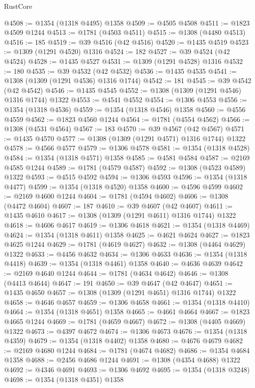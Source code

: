 \begin{lexlean}{RustCore}
\begin{coremodule}
@4508 := @1354 (@1318 @4495) @1358
@4509 := @4505 @4508
@4511 := @1823 @4509 @1244
@4513 := @1781 (@4503 @4511)
@4515 := @1308 (@4480 @4513)
@4516 := 185
@4519 := @39 @4516 (@42 @4516)
@4520 := @1435 @4519
@4523 := @1309 (@1291 @4520) @1316
@4524 := 182
@4527 := @39 @4524 (@42 @4524)
@4528 := @1435 @4527
@4531 := @1309 (@1291 @4528) @1316
@4532 := 180
@4535 := @39 @4532 (@42 @4532)
@4536 := @1435 @4535
@4541 := @1308 (@1309 (@1291 @4536) @1316 @1744)
@4542 := 181
@4545 := @39 @4542 (@42 @4542)
@4546 := @1435 @4545
@4552 := @1308 (@1309 (@1291 @4546) @1316 @1744) @1322
@4553 := @4541 @4552
@4554 := @1306 @4553
@4556 := @1354 (@1318 @4536)
@4559 := @1354 (@1318 @4546) @1358
@4560 := @4556 @4559
@4562 := @1823 @4560 @1244
@4564 := @1781 (@4554 @4562)
@4566 := @1308 (@4531 @4564)
@4567 := 183
@4570 := @39 @4567 (@42 @4567)
@4571 := @1435 @4570
@4577 := @1308 (@1309 (@1291 @4571) @1316 @1744) @1322
@4578 := @4566 @4577
@4579 := @1306 @4578
@4581 := @1354 (@1318 @4528)
@4584 := @1354 (@1318 @4571) @1358
@4585 := @4581 @4584
@4587 := @2169 @4585 @1244
@4589 := @1781 (@4579 @4587)
@4592 := @1308 (@4523 @4589) @1322
@4593 := @4515 @4592
@4594 := @1306 @4593
@4596 := @1354 (@1318 @4477)
@4599 := @1354 (@1318 @4520) @1358
@4600 := @4596 @4599
@4602 := @2169 @4600 @1244
@4604 := @1781 (@4594 @4602)
@4606 := @1308 (@4472 @4604)
@4607 := 187
@4610 := @39 @4607 (@42 @4607)
@4611 := @1435 @4610
@4617 := @1308 (@1309 (@1291 @4611) @1316 @1744) @1322
@4618 := @4606 @4617
@4619 := @1306 @4618
@4621 := @1354 (@1318 @4469)
@4624 := @1354 (@1318 @4611) @1358
@4625 := @4621 @4624
@4627 := @1823 @4625 @1244
@4629 := @1781 (@4619 @4627)
@4632 := @1308 (@4464 @4629) @1322
@4633 := @4456 @4632
@4634 := @1306 @4633
@4636 := @1354 (@1318 @4418)
@4639 := @1354 (@1318 @4461) @1358
@4640 := @4636 @4639
@4642 := @2169 @4640 @1244
@4644 := @1781 (@4634 @4642)
@4646 := @1308 (@4413 @4644)
@4647 := 191
@4650 := @39 @4647 (@42 @4647)
@4651 := @1435 @4650
@4657 := @1308 (@1309 (@1291 @4651) @1316 @1744) @1322
@4658 := @4646 @4657
@4659 := @1306 @4658
@4661 := @1354 (@1318 @4410)
@4664 := @1354 (@1318 @4651) @1358
@4665 := @4661 @4664
@4667 := @1823 @4665 @1244
@4669 := @1781 (@4659 @4667)
@4672 := @1308 (@4405 @4669) @1322
@4673 := @4397 @4672
@4674 := @1306 @4673
@4676 := @1354 (@1318 @4359)
@4679 := @1354 (@1318 @4402) @1358
@4680 := @4676 @4679
@4682 := @2169 @4680 @1244
@4684 := @1781 (@4674 @4682)
@4686 := @1354 @4684 @1358
@4688 := @2456 @4686 @1244
@4691 := @1308 (@4354 @4688) @1322
@4692 := @4346 @4691
@4693 := @1306 @4692
@4695 := @1354 (@1318 @3248)
@4698 := @1354 (@1318 @4351) @1358

\end{coremodule}
\end{lexlean}
